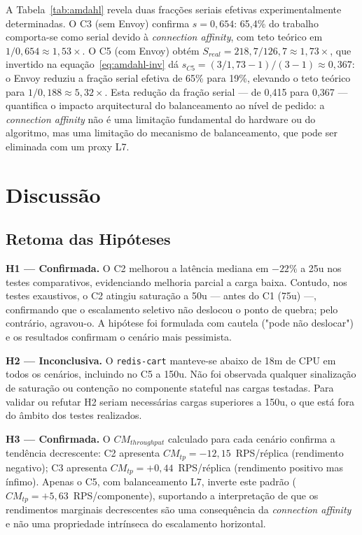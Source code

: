 \documentclass[manuscript,screen,review]{acmart}
\begin{document}
A Tabela~\ref{tab:amdahl} revela duas fracções seriais efetivas experimentalmente determinadas. O C3 (sem Envoy) confirma $s=0{,}654$: 65,4\% do trabalho comporta-se como serial devido à \textit{connection affinity}, com teto teórico em $1/0{,}654 \approx 1{,}53\times$. O C5 (com Envoy) obtém $S_{real}=218{,}7/126{,}7\approx 1{,}73\times$, que invertido na equação~\ref{eq:amdahl-inv} dá $s_{C5}=(3/1{,}73-1)/(3-1)\approx 0{,}367$: o Envoy reduziu a fração serial efetiva de 65\% para 19\%, elevando o teto teórico para $1/0{,}188\approx 5{,}32\times$. Esta redução da fração serial — de 0,415 para 0,367 — quantifica o impacto arquitectural do balanceamento ao nível de pedido: a \textit{connection affinity} não é uma limitação fundamental do hardware ou do algoritmo, mas uma limitação do mecanismo de balanceamento, que pode ser eliminada com um proxy L7.

\section{Discussão}
\label{sec:discussao}

\subsection{Retoma das Hipóteses}
\label{sec:hipoteses-discussao}

\textbf{H1 — Confirmada.} O C2 melhorou a latência mediana em $-22\%$ a 25u nos testes comparativos, evidenciando melhoria parcial a carga baixa. Contudo, nos testes exaustivos, o C2 atingiu saturação a 50u — antes do C1 (75u) —, confirmando que o escalamento seletivo não deslocou o ponto de quebra; pelo contrário, agravou-o. A hipótese foi formulada com cautela ("pode não deslocar") e os resultados confirmam o cenário mais pessimista.

\textbf{H2 — Inconclusiva.} O \texttt{redis-cart} manteve-se abaixo de 18m de CPU em todos os cenários, incluindo no C5 a 150u. Não foi observada qualquer sinalização de saturação ou contenção no componente stateful nas cargas testadas. Para validar ou refutar H2 seriam necessárias cargas superiores a 150u, o que está fora do âmbito dos testes realizados.

\textbf{H3 — Confirmada.} O $CM_{throughput}$ calculado para cada cenário confirma a tendência decrescente: C2 apresenta $CM_{tp}=-12{,}15$~RPS/réplica (rendimento negativo); C3 apresenta $CM_{tp}=+0{,}44$~RPS/réplica (rendimento positivo mas ínfimo). Apenas o C5, com balanceamento L7, inverte este padrão ($CM_{tp}=+5{,}63$~RPS/componente), suportando a interpretação de que os rendimentos marginais decrescentes são uma consequência da \textit{connection affinity} e não uma propriedade intrínseca do escalamento horizontal.
\end{document}
